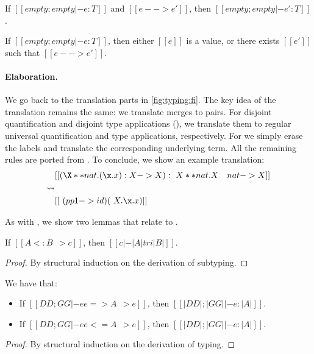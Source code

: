 \begin{theorem}
  If $[[empty; empty |- e : T]]$ and $[[e --> e']]$, then $[[empty; empty |- e' : T]]$.
\end{theorem}

\begin{theorem}
  If $[[empty; empty |- e : T]]$, then either $[[e]]$ is a value, or there exists $[[e']]$ such
  that $[[e --> e']]$.
\end{theorem}


\paragraph{Elaboration.}

We go back to the translation parts in \cref{fig:typing:fi}. The key idea of the
translation remains the same: we translate merges to pairs. For disjoint
quantification and disjoint type applications (), we
translate them to regular universal quantification and type applications,
respectively. For  we simply erase
the labels and translate the corresponding underlying term. All the remaining
rules are ported from \namee. To conclude, we show an example translation:
\begin{align*}
  & [[ (\X ** nat . (\x . x) : X -> X)  : \ X ** nat . X & nat -> X ]] \\
  \rightsquigarrow & \\
  & [[\ (pp1 -> id)  (\ X . \x . x)]]
\end{align*}

As with \namee, we show two lemmas that relate \fnamee to \tnamee.

\begin{lemma}
  If $[[A <: B ~~> c]]$, then $[[c |-  |A| tri |B|]]$.
  \label{lemma:sub-correct:fi}
\end{lemma}
\begin{proof}
  By structural induction on the derivation of subtyping.
\end{proof}


\begin{lemma} We have that:
  \begin{itemize}
  \item If $[[DD ; GG |- ee => A ~~> e]]$, then $[[ |DD| ; |GG| |- e : |A | ]]$.
  \item If $[[DD ; GG |- ee <= A ~~> e]]$, then $[[ |DD| ; |GG| |- e : |A | ]]$.
  \end{itemize}
\end{lemma}
\begin{proof}
  By structural induction on the derivation of typing.
\end{proof}



